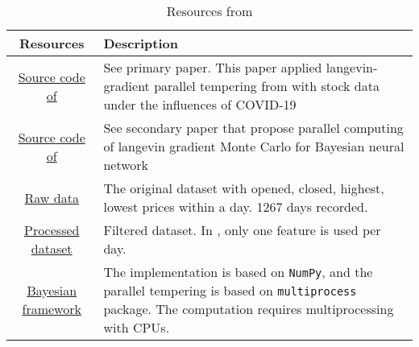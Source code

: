 \documentclass[a4paper]{article}
\begin{document}
\begin{table}[h]
    \centering
    \begin{tabularx}{\textwidth}{cX}
       \textbf{Resources} & \textbf{Description} \\
       \hline
       \href{https://github.com/sydney-machine-learning/Bayesianneuralnet_stockmarket}{Source code  of \cite{chandra2021bayesian}} & See primary paper\cite{chandra2021bayesian}. This paper applied langevin-gradient parallel tempering from \cite{chandra2019langevin} with stock data under the influences of COVID-19\\\hline
       \href{https://github.com/sydney-machine-learning/parallel-tempering-neural-net}{Source code of \cite{chandra2019langevin}} & See secondary paper\cite{chandra2019langevin} that propose parallel computing of langevin gradient Monte Carlo for Bayesian neural network\\\hline
        \href{https://github.com/sydney-machine-learning/Bayesianneuralnet_stockmarket/blob/master/code/datasets/raw/DAI.DE.csv}{Raw data}  & The original dataset with opened, closed, highest, lowest prices within a day. 1267 days recorded.  \\\hline
       \href{https://github.com/sydney-machine-learning/Bayesianneuralnet_stockmarket/blob/master/code/datasets/600118.SS_1_train.txt}{Processed dataset}  & Filtered dataset. In \cite{chandra2021bayesian}, only one feature is used per day.  \\\hline
       \href{https://github.com/sydney-machine-learning/Bayesianneuralnet_stockmarket/blob/6d24cf25115b6517e3099249bc657674f6b9b98f/code/pt_timeseries_regression.py\#L36-L142}{Bayesian framework} & The implementation is based on \texttt{NumPy}, and the parallel tempering is based on \texttt{multiprocess} package. The computation requires multiprocessing with CPUs.\\
    \end{tabularx}
    \caption{Resources from \cite{chandra2021bayesian}}
    \label{tab:my_label}
\end{table}


\end{document}
